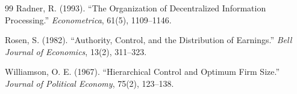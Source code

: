 \documentclass[11pt,a4paper]{article}
\theoremstyle{plain}
\begin{document}
\begin{thebibliography}{99}
Radner, R. (1993). ``The Organization of Decentralized Information Processing.'' \emph{Econometrica}, 61(5), 1109--1146.

Rosen, S. (1982). ``Authority, Control, and the Distribution of Earnings.'' \emph{Bell Journal of Economics}, 13(2), 311--323.

Williamson, O. E. (1967). ``Hierarchical Control and Optimum Firm Size.'' \emph{Journal of Political Economy}, 75(2), 123--138.

\end{thebibliography}
\end{document}
